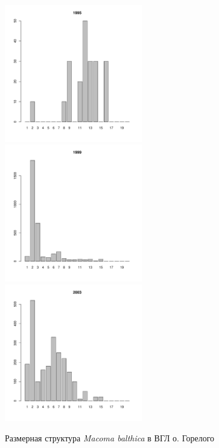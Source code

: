 \begin{figure}[h]
\begin{multicols}{3}
\hfill
\includegraphics[width=60mm]{../White_Sea/Luvenga_Goreliy/high_1995_.pdf}
\hfill
\includegraphics[width=60mm]{../White_Sea/Luvenga_Goreliy/high_1999_.pdf}
\hfill
\includegraphics[width=60mm]{../White_Sea/Luvenga_Goreliy/high_2003_.pdf}
\end{multicols}


\caption{Размерная структура {\it Macoma balthica} в ВГЛ о. Горелого}
\label{ris:size_str_Goreliy_high}
\end{figure}


